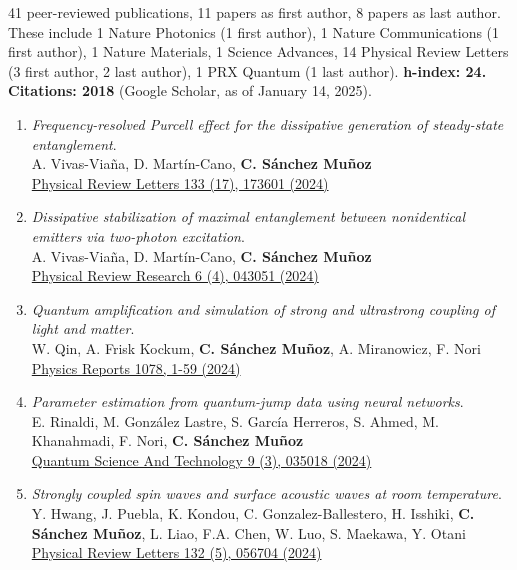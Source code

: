 
41 peer-reviewed publications, 11 papers as first author, 8 papers as last author.
These include 1 Nature Photonics (1 first author), 1 Nature Communications (1 first author), 1 Nature Materials, 1 Science Advances, 14 Physical Review Letters (3 first author, 2 last author), 1 PRX Quantum (1 last author).
\textbf{h-index: 24. Citations: 2018} (Google Scholar, as of January 14, 2025).

\begin{enumerate}
 \item \emph{Frequency-resolved Purcell effect for the dissipative generation of steady-state entanglement}.\\ 
{A. Vivas-Viaña, D. Martín-Cano, \textbf{C. Sánchez Muñoz}}\\ 
  \href{https://journals.aps.org/prl/abstract/10.1103/PhysRevLett.133.173601}{{Physical Review Letters 133 (17), 173601 (2024)}}

 \item \emph{Dissipative stabilization of maximal entanglement between nonidentical emitters via two-photon excitation}.\\ 
{A. Vivas-Viaña, D. Martín-Cano, \textbf{C. Sánchez Muñoz}}\\ 
  \href{https://journals.aps.org/prresearch/abstract/10.1103/PhysRevResearch.6.043051}{{Physical Review Research 6 (4), 043051 (2024)}}

 \item \emph{Quantum amplification and simulation of strong and ultrastrong coupling of light and matter}.\\ 
{W. Qin, A. Frisk Kockum, \textbf{C. Sánchez Muñoz}, A. Miranowicz, F. Nori}\\ 
  \href{https://www.sciencedirect.com/science/article/pii/S0370157324001571}{{Physics Reports 1078, 1-59 (2024)}}

 \item \emph{Parameter estimation from quantum-jump data using neural networks}.\\ 
{E. Rinaldi, M. González Lastre, S. García Herreros, S. Ahmed, M. Khanahmadi, F. Nori, \textbf{C. Sánchez Muñoz}}\\ 
  \href{https://iopscience.iop.org/article/10.1088/2058-9565/ad3c68/meta}{{Quantum Science And Technology 9 (3), 035018 (2024)}}

 \item \emph{Strongly coupled spin waves and surface acoustic waves at room temperature}.\\ 
{Y. Hwang, J. Puebla, K. Kondou, C. Gonzalez-Ballestero, H. Isshiki, \textbf{C. Sánchez Muñoz}, L. Liao, F.A. Chen, W. Luo, S. Maekawa, Y. Otani}\\ 
  \href{https://journals.aps.org/prl/abstract/10.1103/PhysRevLett.132.056704}{{Physical Review Letters 132 (5), 056704 (2024)}}


\end{enumerate}
